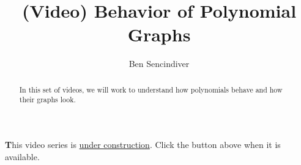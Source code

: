\documentclass{ximera}
\title[Prerequisite Videos: ]{(Video) Behavior of Polynomial Graphs}
\author{Ben Sencindiver}
\begin{document}
\begin{abstract}
   In this set of videos, we will work to understand how 
   polynomials behave and how their graphs look.  
\end{abstract}
\maketitle



{\textbf This video series is \underline{under construction}. Click the  button above when it is available}.
\end{document}
